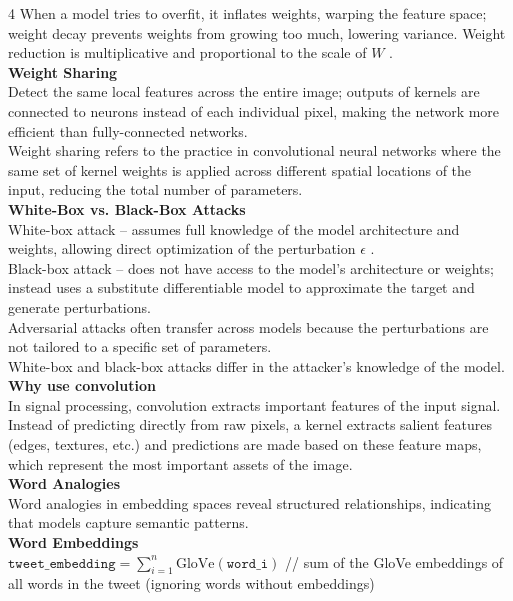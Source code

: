 \documentclass[8pt]{extarticle}
\begin{document}
\begin{multicols}{4}
When a model tries to overfit, it inflates weights, warping the feature space; weight decay prevents weights from growing too much, lowering variance. Weight reduction is multiplicative and proportional to the scale of $W$ .\\
\vspace{2pt}\textbf{Weight Sharing}\\
Detect the same local features across the entire image; outputs of kernels are connected to neurons instead of each individual pixel, making the network more efficient than fully-connected networks.\\
Weight sharing refers to the practice in convolutional neural networks where the same set of kernel weights is applied across different spatial locations of the input, reducing the total number of parameters.\\
\vspace{2pt}\textbf{White-Box vs. Black-Box Attacks}\\
White-box attack -- assumes full knowledge of the model architecture and weights, allowing direct optimization of the perturbation $\epsilon$ .\\
Black-box attack -- does not have access to the model's architecture or weights; instead uses a substitute differentiable model to approximate the target and generate perturbations.\\
Adversarial attacks often transfer across models because the perturbations are not tailored to a specific set of parameters.\\
White-box and black-box attacks differ in the attacker's knowledge of the model.\\
\vspace{2pt}\textbf{Why use convolution}\\
In signal processing, convolution extracts important features of the input signal. Instead of predicting directly from raw pixels, a kernel extracts salient features (edges, textures, etc.) and predictions are made based on these feature maps, which represent the most important assets of the image.\\
\vspace{2pt}\textbf{Word Analogies}\\
Word analogies in embedding spaces reveal structured relationships, indicating that models capture semantic patterns.\\
\vspace{2pt}\textbf{Word Embeddings}\\
$\texttt{tweet\_embedding} = \sum_{i=1}^{n} \text{GloVe}(\texttt{word\_i})$ // sum of the GloVe embeddings of all words in the tweet (ignoring words without embeddings)\\

\end{multicols}
\end{document}
